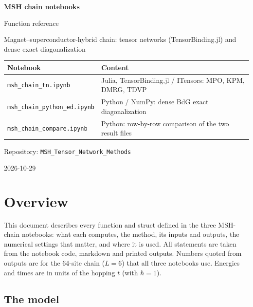 \documentclass[11pt]{article}
\newcommand{\nb}[1]{\texttt{#1}}
\begin{document}
\begin{titlepage}
\centering
\vspace*{3cm}
{\Huge\bfseries MSH chain notebooks\par}
\vspace{0.6cm}
{\LARGE Function reference\par}
\vspace{1.5cm}
{\large Magnet–superconductor-hybrid chain: tensor networks (TensorBinding.jl) and dense exact diagonalization\par}
\vspace{1.5cm}
\begin{tabular}{ll}
\toprule
Notebook & Content\\
\midrule
\nb{msh\_chain\_tn.ipynb} & Julia, TensorBinding.jl / ITensors: MPO, KPM, DMRG, TDVP\\
\nb{msh\_chain\_python\_ed.ipynb} & Python / NumPy: dense BdG exact diagonalization\\
\nb{msh\_chain\_compare.ipynb} & Python: row-by-row comparison of the two result files\\
\bottomrule
\end{tabular}
\vspace{1.5cm}

Repository: \nb{MSH\_Tensor\_Network\_Methods}\par
\vfill
{\large 2026-10-29\par}
\end{titlepage}

\tableofcontents
\clearpage

\section{Overview}

This document describes every function and struct defined in the three MSH-chain notebooks: what each computes, the method, its inputs and outputs, the numerical settings that matter, and where it is used. All statements are taken from the notebook code, markdown and printed outputs. Numbers quoted from outputs are for the 64-site chain ($L=6$) that all three notebooks use. Energies and times are in units of the hopping $t$ (with $\hbar=1$).

\subsection{The model}
\end{document}
